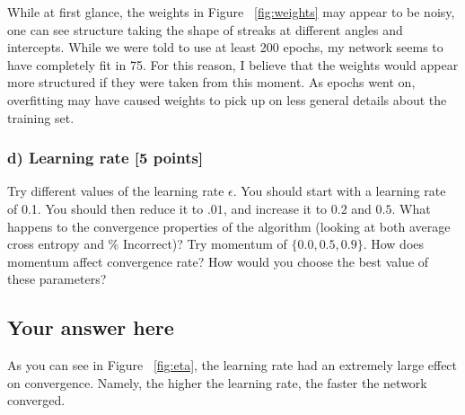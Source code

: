 \documentclass{article}
\begin{document}
While at first glance, the weights in Figure ~\ref{fig:weights} may appear to be noisy, one can see structure taking the shape of streaks at different angles and intercepts. 
While we were told to use at least 200 epochs, my network seems to have completely fit in 75. For this reason, I believe that the weights would appear more structured if they were taken from this moment. As epochs went on, overfitting may have caused weights to pick up on less general details about the training set.

\subsubsection*{d) Learning rate [5 points]}
Try different values of the learning rate $\epsilon$. 
You should start with a learning rate of 0.1. 
You should then reduce it to $.01$, and increase it to $0.2$ and
$0.5$. What happens to the convergence properties of the algorithm (looking at
both average cross entropy and \% Incorrect)? Try momentum of $\{0.0, 0.5, 0.9\}$. How does
momentum affect convergence rate? How would you choose the best value of these
parameters?

\subsection*{Your answer here}

As you can see in Figure ~\ref{fig:eta}, the learning rate had an extremely large effect on convergence. Namely, the higher the learning rate, the faster the network converged.
\end{document}
